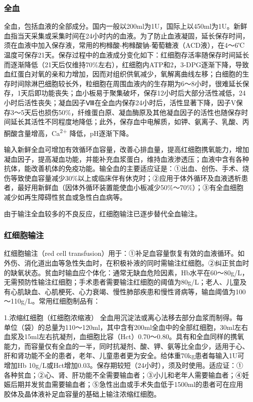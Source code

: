 \subsubsection{全血}

全血，包括血液的全部成分。国内一般以200ml为1U，国际上以450ml为1U。新鲜血指当天采集或采集时间在24小时内的血液。为了防止血液凝固，延长保存时间，须在血液中加入保存液，常用的枸橼酸-枸橼酸钠-葡萄糖液（ACD液），在4～6℃温度可保存21天。保存过程中的血液成分变化如下：红细胞存活率随保存时间延长而逐渐降低（21天后仅维持70\%左右），红细胞内ATP和2，3-DPG逐渐下降，导致血红蛋白对氧的亲和力增加，因而对组织供氧减少，氧解离曲线左移；白细胞的生存时间除淋巴细胞较长外，粒细胞在周围血液内的生存期为6～8小时，很难延长保存，1天后即功能丧失；血小板易于聚集破坏，保存12小时后大部分活性减低，24小时后活性丧失；凝血因子Ⅷ在全血内保存24小时后，活性显著下降，因子V保存3～5天后也损伤50\%，纤维蛋白原、凝血酶原及其他凝血因子的活性也随保存时间延长其活性不同程度地降低；此外，保存血中电解质，如钾、氨离子、乳酸、丙酮酸含量增高，Ca\textsuperscript{2+}
降低，pH逐渐下降。

输入新鲜全血可增加有效循环血容量，改善心排血量，提高红细胞携氧能力，增加凝血因子，提高凝血功能，并能补充血浆蛋白，维持血液渗透压；血液中含有各种抗体，能改善机体的免疫功能。输全血的主要适应证是：①出血、创伤、手术、烧伤等致使血容量减少30\%以上或临床伴有休克时；②应用于体外循环及血液透析患者，最好用新鲜血（因体外循环装置能使血小板减少50\%～70\%）；③有全血细胞减少如再生障碍性贫血或急性白血病等。

由于输注全血较多的不良反应，红细胞输注已逐步替代全血输注。

\subsubsection{红细胞输注}

红细胞输注（red cell
transfusion）用于：①补足血容量恢复有效的血液循环。如外伤、消化道出血等急性失血时，在积极补液的同时需输注红细胞。②纠正贫血时的缺氧状态。贫血时输血应个体化：通常无缺血危险因素，Hb水平在60～80g/L，无需预防性输注红细胞；手术患者需要输注红细胞的阈值为80g/L；老人、儿童及有心肌缺血、心肌梗死、心力衰竭、慢性肺部疾患和慢性肾病等，输血阈值为100～110g/L。常用红细胞制品有：

1.浓缩红细胞（红细胞浓缩液）
全血用沉淀法或离心法移去部分血浆而制得。每单位（袋）的总量为110～120ml，其中含有200ml全血中的全部红细胞，30ml左右血浆及15ml左右抗凝剂，血细胞比容（Hct）0.70～0.80。具有和全血同样的携氧能力，而容量仅有全血的一半，同时抗凝剂、酸、钾、氨等比全血少，适用于心、肝和肾功能不全的患者，老年、儿童患者更为安全。给体重70kg患者每输入1U可增加Hb
10g/L或Hct增加0.03。保存期较短（24小时），须及时使用。适应证：①各种贫血；②心、肾、肝功能不全需要输血者；③小儿和老年人需要输血者；④妊娠后期并发贫血需要输血者；⑤急性出血或手术失血低于1500ml的患者可在应用胶体及晶体液补足血容量的基础上输注浓缩红细胞。

